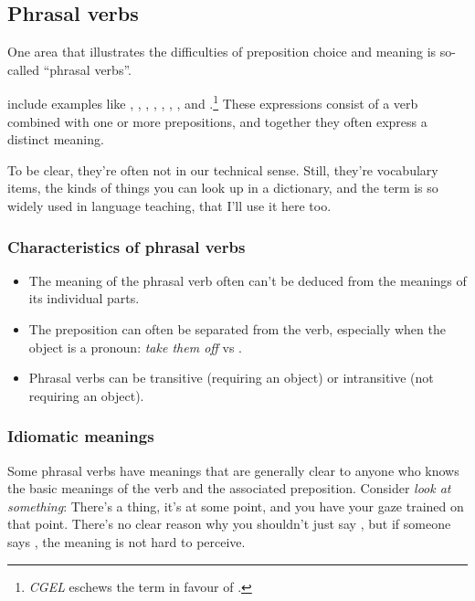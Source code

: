 \subsection{Phrasal verbs}\label{ssec:phrasal-verbs}

One area that illustrates the difficulties of preposition choice and meaning is so-called \enquote{phrasal verbs}.

 include examples like , , , ,
, , , and .\footnote{\textit{CGEL} \citep{Huddleston2002} eschews the term  in favour of .} These expressions consist of a verb
combined with one or more prepositions, and together they often express a distinct meaning.

To be clear, they're often not  in our technical sense. Still,
they're vocabulary items, the kinds of things you can look up in a dictionary,
and the term  is so widely used in language teaching, that I'll use
it here too.

\subsubsection*{Characteristics of phrasal verbs}

\begin{itemize}[noitemsep]
    \item The meaning of the phrasal verb often can't be deduced from the meanings
    of its individual parts.
    \item The preposition can often be separated from the verb, especially when the
    object is a pronoun: \textit{take \emph{them} off} vs .
    \item Phrasal verbs can be transitive (requiring an object) or intransitive (not
    requiring an object).
\end{itemize}

\subsubsection*{Idiomatic meanings}
Some phrasal verbs have meanings that are generally clear to anyone who knows
the basic meanings of the verb and the associated preposition. Consider \textit{look at
something}: There's a thing, it's at some point, and you have your gaze trained
on that point. There's no clear reason why you shouldn't just say , but if
someone says , the meaning is not hard to perceive. 

